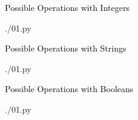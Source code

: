 \documentclass[landscape]{slides}
\begin{document}
\begin{slide}
  \textcolor{black}{\large{Possible Operations with Integers}}
    \begin{lstinputlisting}[firstline=18, lastline=27]
      {./01.py}
    \end{lstinputlisting}
\end{slide}

\begin{slide}
  \textcolor{black}{\large{Possible Operations with Strings}}
    \begin{lstinputlisting}[firstline=29, lastline=37]
      {./01.py}
    \end{lstinputlisting}
\end{slide}

\begin{slide}
  \textcolor{black}{\large{Possible Operations with Booleans}}
  \begin{lstinputlisting}[firstline=39, lastline=50]
    {./01.py}
  \end{lstinputlisting}
\end{slide}

\begin{slide}
  
\end{slide}
\end{document}
